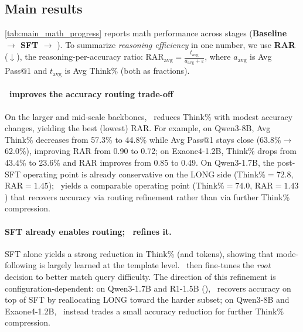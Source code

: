 \subsection{Main results}
\autoref{tab:main_math_progress} reports math performance across stages (\textbf{Baseline $\rightarrow$ SFT $\rightarrow$ \Ours}).
To summarize \emph{reasoning efficiency} in one number, we use \textbf{RAR} (\(\downarrow\)), the reasoning-per-accuracy ratio:
$\mathrm{RAR}_{\text{avg}}=\frac{t_{\text{avg}}}{a_{\text{avg}}+\varepsilon}$,
where \(a_{\text{avg}}\) is Avg Pass@1 and \(t_{\text{avg}}\) is Avg Think\% (both as fractions). %

\paragraph{\Ours~improves the accuracy routing trade-off}
On the larger and mid-scale backbones, \Ours~reduces Think\% with modest accuracy changes, yielding the best (lowest) RAR.
For example, on Qwen3-8B, Avg Think\% decreases from 57.3\% to 44.8\% while Avg Pass@1 stays close (63.8\%$\rightarrow$62.0\%), improving RAR from 0.90 to 0.72; on Exaone4-1.2B, Think\% drops from 43.4\% to 23.6\% and RAR improves from 0.85 to 0.49. 
On Qwen3-1.7B, the post-SFT operating point is already conservative on the LONG side (Think\%${=}72.8$, RAR${=}1.45$); \Ours~yields a comparable operating point (Think\%${=}74.0$, RAR${=}1.43$) that recovers accuracy via routing refinement rather than via further Think\% compression. 

\paragraph{SFT already enables routing; \Ours~refines it.}
SFT alone yields a strong reduction in Think\% (and tokens), showing that mode-following is largely learned at the template level.
\Ours~then fine-tunes the \emph{root} decision to better match query difficulty. 
The direction of this refinement is configuration-dependent: on Qwen3-1.7B and R1-1.5B (), \Ours~recovers accuracy on top of SFT by reallocating LONG toward the harder subset; on Qwen3-8B and Exaone4-1.2B, \Ours~instead trades a small accuracy reduction for further Think\% compression.

